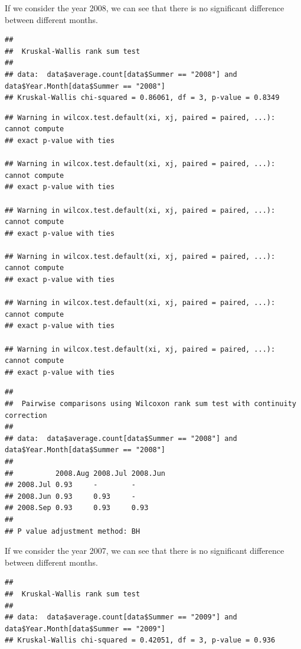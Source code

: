 \documentclass[
]{article}
\begin{document}
If we consider the year 2008, we can see that there is no significant
difference between different months.

\begin{verbatim}
## 
##  Kruskal-Wallis rank sum test
## 
## data:  data$average.count[data$Summer == "2008"] and data$Year.Month[data$Summer == "2008"]
## Kruskal-Wallis chi-squared = 0.86061, df = 3, p-value = 0.8349
\end{verbatim}

\begin{verbatim}
## Warning in wilcox.test.default(xi, xj, paired = paired, ...): cannot compute
## exact p-value with ties

## Warning in wilcox.test.default(xi, xj, paired = paired, ...): cannot compute
## exact p-value with ties

## Warning in wilcox.test.default(xi, xj, paired = paired, ...): cannot compute
## exact p-value with ties

## Warning in wilcox.test.default(xi, xj, paired = paired, ...): cannot compute
## exact p-value with ties

## Warning in wilcox.test.default(xi, xj, paired = paired, ...): cannot compute
## exact p-value with ties

## Warning in wilcox.test.default(xi, xj, paired = paired, ...): cannot compute
## exact p-value with ties
\end{verbatim}

\begin{verbatim}
## 
##  Pairwise comparisons using Wilcoxon rank sum test with continuity correction 
## 
## data:  data$average.count[data$Summer == "2008"] and data$Year.Month[data$Summer == "2008"] 
## 
##          2008.Aug 2008.Jul 2008.Jun
## 2008.Jul 0.93     -        -       
## 2008.Jun 0.93     0.93     -       
## 2008.Sep 0.93     0.93     0.93    
## 
## P value adjustment method: BH
\end{verbatim}

If we consider the year 2007, we can see that there is no significant
difference between different months.

\begin{verbatim}
## 
##  Kruskal-Wallis rank sum test
## 
## data:  data$average.count[data$Summer == "2009"] and data$Year.Month[data$Summer == "2009"]
## Kruskal-Wallis chi-squared = 0.42051, df = 3, p-value = 0.936
\end{verbatim}
\end{document}
